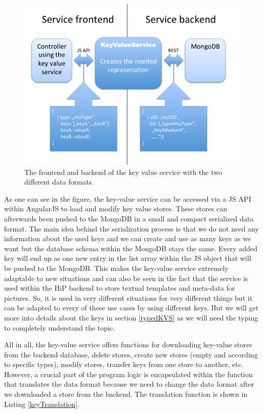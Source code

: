 \begin{figure}[th]
\centerline{\includegraphics[width=1\textwidth]{gfx/kvs}}
\caption{The frontend and backend of the key value service with the two different data formats.}
\label{KVS}
\end{figure}

As one can see in the figure, the key-value service can be accessed via a \ac{JS} \ac{API} within AngularJS to load and modify key value stores. These stores can afterwards been pushed to the MongoDB in a small and compact serialized data format. The main idea behind the serialization process is that we do not need any information about the used keys and we can create and use as many keys as we want but the database schema within the MongoDB stays the same. Every added key will end up as one new entry in the list array within the \ac{JS} object that will be pushed to the MongoDB. This makes the key-value service extremely adaptable to new situations and can also be seen in the fact that the service is used within the \ac{HiP} backend to store textual templates and meta-data for pictures. So, it is used in very different situations for very different things but it can be adapted to every of these use cases by using different keys. But we will get more into details about the keys in section \ref{typedKVS} as we will need the typing to completely understand the topic.
 
All in all, the key-value service offers functions for downloading key-value stores from the backend database, delete stores, create new stores (empty and according to specific types), modify stores, transfer keys from one store to another, etc.  
However, a crucial part of the program logic is encapsulated within the function that translates the data format because we need to change the data format after we downloaded a store from the backend. The translation function is shown in Listing \ref{keyTranslation}. 
 
